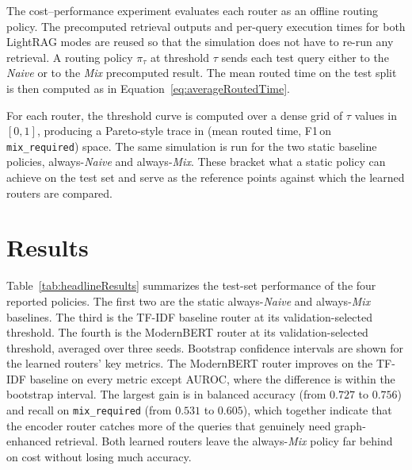 \documentclass[english, bibtex]{kththesis}               %
\numberwithin{listing}{chapter}
\begin{document}
The cost--performance experiment evaluates each router as an offline routing policy. The precomputed retrieval outputs and per-query execution times for both LightRAG modes are reused so that the simulation does not have to re-run any retrieval. A routing policy $\pi_{\tau}$ at threshold $\tau$ sends each test query either to the \emph{Naive} or to the \emph{Mix} precomputed result. The mean routed time on the test split is then computed as in Equation~\ref{eq:averageRoutedTime}.

For each router, the threshold curve is computed over a dense grid of $\tau$ values in $[0, 1]$, producing a Pareto-style trace in (mean routed time, F1\,on \texttt{mix\_required}) space. The same simulation is run for the two static baseline policies, always-\emph{Naive} and always-\emph{Mix}. These bracket what a static policy can achieve on the test set and serve as the reference points against which the learned routers are compared.

\section{Results}
\label{sec:implResults}

Table~\ref{tab:headlineResults} summarizes the test-set performance of the four reported policies. The first two are the static always-\emph{Naive} and always-\emph{Mix} baselines. The third is the TF-IDF baseline router at its validation-selected threshold. The fourth is the ModernBERT router at its validation-selected threshold, averaged over three seeds. Bootstrap confidence intervals are shown for the learned routers' key metrics. The ModernBERT router improves on the TF-IDF baseline on every metric except AUROC, where the difference is within the bootstrap interval. The largest gain is in balanced accuracy (from $0.727$ to $0.756$) and recall on \texttt{mix\_required} (from $0.531$ to $0.605$), which together indicate that the encoder router catches more of the queries that genuinely need graph-enhanced retrieval. Both learned routers leave the always-\emph{Mix} policy far behind on cost without losing much accuracy.
\end{document}
